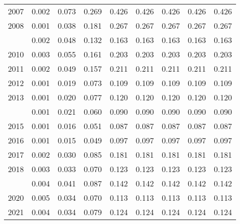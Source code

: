\documentclass[
]{article}
\begin{document}
\begin{longtable}[t]{lrrrrrrrr}
2007 & 0.002 & 0.073 & 0.269 & 0.426 & 0.426 & 0.426 & 0.426 & 0.426\\
2008 & 0.001 & 0.038 & 0.181 & 0.267 & 0.267 & 0.267 & 0.267 & 0.267\\
\addlinespace
2009 & 0.002 & 0.048 & 0.132 & 0.163 & 0.163 & 0.163 & 0.163 & 0.163\\
2010 & 0.003 & 0.055 & 0.161 & 0.203 & 0.203 & 0.203 & 0.203 & 0.203\\
2011 & 0.002 & 0.049 & 0.157 & 0.211 & 0.211 & 0.211 & 0.211 & 0.211\\
2012 & 0.001 & 0.019 & 0.073 & 0.109 & 0.109 & 0.109 & 0.109 & 0.109\\
2013 & 0.001 & 0.020 & 0.077 & 0.120 & 0.120 & 0.120 & 0.120 & 0.120\\
\addlinespace
2014 & 0.001 & 0.021 & 0.060 & 0.090 & 0.090 & 0.090 & 0.090 & 0.090\\
2015 & 0.001 & 0.016 & 0.051 & 0.087 & 0.087 & 0.087 & 0.087 & 0.087\\
2016 & 0.001 & 0.015 & 0.049 & 0.097 & 0.097 & 0.097 & 0.097 & 0.097\\
2017 & 0.002 & 0.030 & 0.085 & 0.181 & 0.181 & 0.181 & 0.181 & 0.181\\
2018 & 0.003 & 0.033 & 0.070 & 0.123 & 0.123 & 0.123 & 0.123 & 0.123\\
\addlinespace
2019 & 0.004 & 0.041 & 0.087 & 0.142 & 0.142 & 0.142 & 0.142 & 0.142\\
2020 & 0.005 & 0.034 & 0.070 & 0.113 & 0.113 & 0.113 & 0.113 & 0.113\\
2021 & 0.004 & 0.034 & 0.079 & 0.124 & 0.124 & 0.124 & 0.124 & 0.124\\*
\end{longtable}
\end{document}
